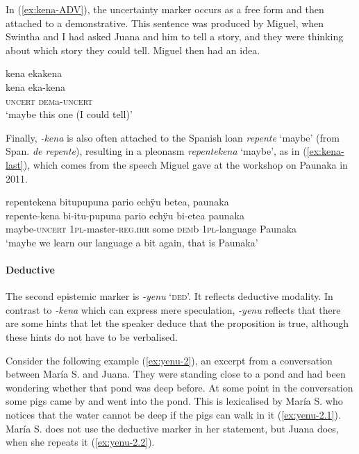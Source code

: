 In (\ref{ex:kena-ADV}), the uncertainty marker occurs as a free form and then attached to a demonstrative. This sentence was produced by Miguel, when Swintha and I had asked Juana and him to tell a story, and they were thinking about which story they could tell. Miguel then had an idea.

\ea\label{ex:kena-ADV}
\begingl
\glpreamble kena ekakena\\
\gla kena eka-kena\\
\glb \textsc{uncert} \textsc{dem}a-\textsc{uncert}\\
\glft ‘maybe this one (I could tell)’
\endgl
\trailingcitation{[jmx-n120429ls-x5.017]}
\xe

Finally, \textit{-kena} is also often attached to the Spanish loan \textit{repente} ‘maybe’ (from Span. \textit{de repente}), resulting in a pleonasm \textit{repentekena} ‘maybe’, as in (\ref{ex:kena-last}), which comes from the speech Miguel gave at the workshop on Paunaka in 2011.

\ea\label{ex:kena-last}
\begingl
\glpreamble repentekena bitupupuna pario echÿu betea, paunaka\\
\gla repente-kena bi-itu-pupuna pario echÿu bi-etea paunaka\\
\glb maybe-\textsc{uncert} 1\textsc{pl}-master-\textsc{reg.irr} some \textsc{dem}b 1\textsc{pl}-language Paunaka\\
\glft ‘maybe we learn our language a bit again, that is Paunaka’
\endgl
\trailingcitation{[mxx-x110916]}
\xe
{}

\paragraph{Deductive}\label{sec:ModalityDeductive}

The second epistemic marker is \textit{-yenu} ‘\textsc{ded}’. It reflects deductive modality. In contrast to \textit{-kena} which can express mere speculation, \textit{-yenu} reflects that there are some hints that let the speaker deduce that the proposition is true, although these hints do not have to be verbalised.

Consider the following example (\ref{ex:yenu-2}), an excerpt from a conversation between María S. and Juana. They were standing close to a pond and had been wondering whether that pond was deep before. At some point in the conversation some pigs came by and went into the pond. This is lexicalised by María S. who notices that the water cannot be deep if the pigs can walk in it (\ref{ex:yenu-2.1}). María S. does not use the deductive marker in her statement, but Juana does, when she repeats it (\ref{ex:yenu-2.2}).

